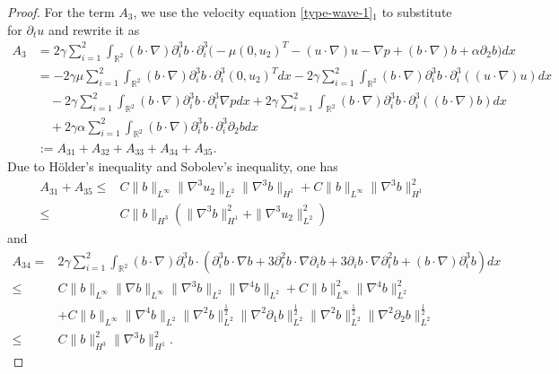 \documentclass[reqno,11pt]{amsart}
\def\R{\mathbb R}
\numberwithin{Thm}{section}
\begin{document}
\begin{proof}
 For the  term $A_{3}$, we use the velocity equation \eqref{type-wave-1}$_1$ to substitute for $\partial_t u$ and  rewrite it as
 \begin{align}\label{A3-8}
A_{3}&=2\gamma\sum_{i=1}^2\int_{\R^2}(b\cdot\nabla)\partial_i^3 b\cdot\partial_i^3\big(-\mu (0,u_2)^T-(u \cdot \nabla) u -\nabla p+(b \cdot \nabla) b+\alpha\partial_2 b\big)dx\nonumber\\
&=-2\gamma\mu\sum_{i=1}^2 \int_{\R^2}(b\cdot\nabla)\partial_i^3 b\cdot\partial_i^3(0,u_2)^Tdx -2\gamma\sum_{i=1}^2\int_{\R^2}(b\cdot\nabla)\partial_i^3 b\cdot\partial_i^3((u \cdot \nabla) u) dx\nonumber\\
&\quad-2\gamma\sum_{i=1}^2\int_{\R^2}(b\cdot\nabla)\partial_i^3 b\cdot\partial_i^3\nabla pdx+2\gamma\sum_{i=1}^2\int_{\R^2}(b\cdot\nabla)\partial_i^3 b\cdot\partial_i^3((b \cdot \nabla) b)dx\nonumber\\
&\quad+2\gamma\alpha\sum_{i=1}^2\int_{\R^2}(b\cdot\nabla)\partial_i^3 b\cdot\partial_i^3\partial_2 bdx\nonumber\\
&:=A_{31}+A_{32}+A_{33}+A_{34}+A_{35}.
\end{align}
Due to  H\"{o}lder's inequality and Sobolev's  inequality, one has
\begin{align}\label{A2}
A_{31}+A_{35}\leq&
C\| b\|_{L^{\infty}}\|\nabla^3u_2\|_{L^2}\|\nabla^3b\|_{H^1}+C\| b\|_{L^{\infty}}\|\nabla^3b\|_{H^1}^2\nonumber\\
\leq& C\|b\|_{H^3}(\|\nabla^3 b\|_{H^1}^2+\|\nabla^3u_2\|_{L^2}^2)
\end{align}
and
\begin{align}\label{A3}
A_{34}=&2\gamma\sum_{i=1}^2\int_{\R^2}(b\cdot\nabla)\partial_i^3 b\cdot(\partial_i^3b \cdot \nabla b+3\partial_i^2b \cdot \nabla\partial_i b+3\partial_i b \cdot\nabla \partial_i^2 b+(b\cdot\nabla)\partial_i^3b)dx\nonumber\\
\leq&
C\| b\|_{L^{\infty}}\| \nabla b\|_{L^{\infty}}\|\nabla^3 b\|_{L^2}\|\nabla^4b\|_{L^2}+C\| b\|_{L^{\infty}}^2\|\nabla^4 b\|_{L^2}^2\nonumber\\
&+C\| b\|_{L^{\infty}}\|\nabla^4b\|_{L^2}\| \nabla^2 b\|_{L^{2}}^{\frac{1}{2}}\| \nabla^2\partial_1 b\|_{L^{2}}^{\frac{1}{2}}\| \nabla^2 b\|_{L^{2}}^{\frac{1}{2}}\| \nabla^2\partial_2 b\|_{L^{2}}^{\frac{1}{2}}\nonumber\\
\leq&
C\| b\|_{H^{3}}^2\|\nabla^3 b\|_{H^1}^2.
\end{align}



\end{proof}
\end{document}
